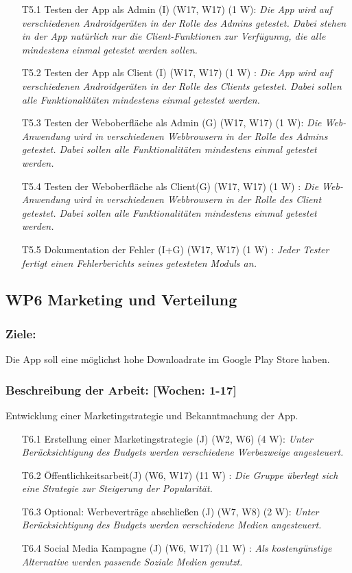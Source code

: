 \documentclass{scrreprt}
\begin{document}
\begin{enumerate}
\item [T5.1] Testen der App als Admin (I) (W17, W17) (1 W): \emph{ Die App wird auf verschiedenen Androidgeräten in der Rolle des Admins getestet. Dabei stehen in der App natürlich nur die Client-Funktionen zur Verfügunng, die alle mindestens einmal getestet werden sollen.}
\item [T5.2] Testen der App als Client (I) (W17, W17) (1 W) : \emph{ Die App wird auf verschiedenen Androidgeräten in der Rolle des Clients getestet. Dabei sollen alle Funktionalitäten mindestens einmal getestet werden.}
\item [T5.3] Testen der Weboberfläche als Admin (G) (W17, W17) (1 W): \emph{ Die Web-Anwendung wird in verschiedenen Webbrowsern in der Rolle des Admins getestet. Dabei sollen alle Funktionalitäten mindestens einmal getestet werden.}
\item [T5.4] Testen der Weboberfläche als Client(G) (W17, W17) (1 W) : \emph{ Die Web-Anwendung wird in verschiedenen Webbrowsern in der Rolle des Client getestet. Dabei sollen alle Funktionalitäten mindestens einmal getestet werden.}
\item [T5.5] Dokumentation der Fehler (I+G) (W17, W17) (1 W) : \emph{Jeder Tester fertigt einen Fehlerberichts seines getesteten Moduls an.}
\end{enumerate}

\subsection*{WP6 Marketing und Verteilung}

\subsubsection{Ziele:} Die App soll eine möglichst hohe Downloadrate im Google Play Store haben.
\subsubsection{Beschreibung der Arbeit: [Wochen: 1-17]} Entwicklung einer Marketingstrategie und Bekanntmachung der App.

\begin{enumerate}
\item [T6.1] Erstellung einer Marketingstrategie (J) (W2, W6) (4 W): \emph{Unter Berücksichtigung des Budgets werden verschiedene Werbezweige angesteuert.}
\item [T6.2] Öffentlichkeitsarbeit(J) (W6, W17) (11 W) : \emph{ Die Gruppe überlegt sich eine Strategie zur Steigerung der Popularität.}
\item [T6.3] Optional: Werbeverträge abschließen (J) (W7, W8) (2 W): \emph{ Unter Berücksichtigung des Budgets werden verschiedene Medien angesteuert.}
\item [T6.4] Social Media Kampagne (J) (W6, W17) (11 W) : \emph{ Als kostengünstige Alternative werden passende Soziale Medien genutzt.}
\end{enumerate}
\end{document}
